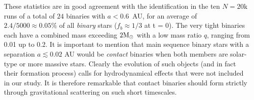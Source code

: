 These statistics are in good agreement with %
the identification                                           %
in the ten $N = 20$k runs  of a total of $24$ binaries with $a < 0.6$~AU, for an average of $2.4 / 5 000  \approx 0.05 \% $ of all {\it  binary} stars  
  ($f_b \approx 1/3$ at t = 0).  The very tight binaries each have a combined mass exceeding $2 {\textrm{M}_\odot}$ with a  low mass ratio $q$, ranging from 0.01 up to 0.2. It is important to mention that main sequence binary stars with a separation 
  $a \lesssim 0.02$ AU would be \textit{contact} binaries when both members are solar-type or more massive stars. 
  Clearly the evolution of such objects (and in fact their formation process) calls for hydrodynamical effects that were not 
  included in our study. It is therefore remarkable that contact binaries should form strictly through gravitational scattering 
  on such short timescales. 
  
  
  

